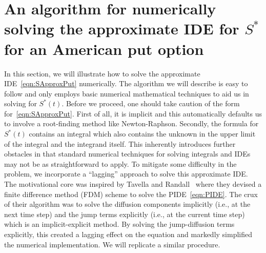 \section{An algorithm for numerically solving the approximate IDE for $S^*$ for an American put option}
In this section, we will illustrate how to solve the approximate IDE~\eqref{eqn:SApproxPut} numerically. The algorithm we will describe is easy to follow and only employs basic numerical mathematical techniques to aid us in solving for $S^*(t)$. Before we proceed, one should take caution of the form for~\eqref{eqn:SApproxPut}. First of all, it is implicit and this automatically defaults us to involve a root-finding method like Newton-Raphson. Secondly, the formula for $S^*(t)$ contains an integral which also contains the unknown in the upper limit of the integral and the integrand itself. This inherently introduces further obstacles in that standard numerical techniques for solving integrals and IDEs may not be as straightforward to apply. To mitigate some difficulty in the problem, we incorporate a ``lagging'' approach to solve this approximate IDE. The motivational core was inspired by Tavella and Randall~\cite{Tavella2000} where they devised a finite difference method (FDM) scheme to solve the PIDE~\eqref{eqn:PIDE}. The crux of their algorithm was to solve the diffusion components implicitly (i.e., at the next time step) and the jump terms explicitly (i.e., at the current time step) which is an implicit-explicit method. By solving the jump-diffusion terms explicitly, this created a lagging effect on the equation and markedly simplified the numerical implementation. We will replicate a similar procedure.

